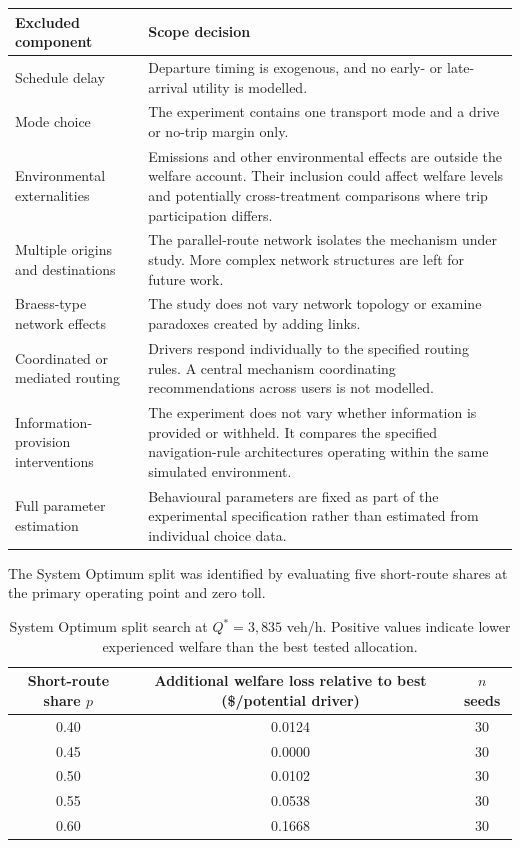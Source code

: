 \documentclass{article}
\begin{document}
\begin{center}
\small
\begin{tabular}{@{}p{}p{}@{}}
\toprule
\textbf{Excluded component} & \textbf{Scope decision} \\
\midrule
Schedule delay & Departure timing is exogenous, and no early- or late-arrival utility is modelled. \\
Mode choice & The experiment contains one transport mode and a drive or no-trip margin only. \\
Environmental externalities & Emissions and other environmental effects are outside the welfare account. Their inclusion could affect welfare levels and potentially cross-treatment comparisons where trip participation differs. \\
Multiple origins and destinations & The parallel-route network isolates the mechanism under study. More complex network structures are left for future work. \\
Braess-type network effects & The study does not vary network topology or examine paradoxes created by adding links. \\
Coordinated or mediated routing & Drivers respond individually to the specified routing rules. A central mechanism coordinating recommendations across users is not modelled. \\
Information-provision interventions & The experiment does not vary whether information is provided or withheld. It compares the specified navigation-rule architectures operating within the same simulated environment. \\
Full parameter estimation & Behavioural parameters are fixed as part of the experimental specification rather than estimated from individual choice data. \\
\bottomrule
\end{tabular}
\end{center}

The System Optimum split was identified by evaluating five short-route shares at the primary operating point and zero toll.

\begin{table}[htbp]
\centering
\small
\setlength{\tabcolsep}{4pt}
\begin{tabular}{ccc}
\toprule
\shortstack{Short-route\\share $p$} & \shortstack{Additional welfare loss\\relative to best (\$/potential driver)} & \shortstack{$n$\\seeds} \\
\midrule
0.40 & 0.0124 & 30 \\
0.45 & 0.0000 & 30 \\
0.50 & 0.0102 & 30 \\
0.55 & 0.0538 & 30 \\
0.60 & 0.1668 & 30 \\
\bottomrule
\end{tabular}
\caption{System Optimum split search at $Q^*=3{,}835$ veh/h. Positive values indicate lower experienced welfare than the best tested allocation.}
\label{tab:so-split-profile}
\end{table}
\end{document}
